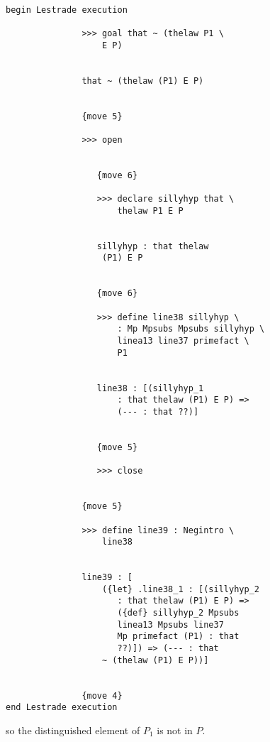 \documentclass[12pt]{article}
\begin{document}
\begin{verbatim}

begin Lestrade execution

               >>> goal that ~ (thelaw P1 \
                   E P)


               that ~ (thelaw (P1) E P)


               {move 5}

               >>> open


                  {move 6}

                  >>> declare sillyhyp that \
                      thelaw P1 E P


                  sillyhyp : that thelaw 
                   (P1) E P


                  {move 6}

                  >>> define line38 sillyhyp \
                      : Mp Mpsubs Mpsubs sillyhyp \
                      linea13 line37 primefact \
                      P1


                  line38 : [(sillyhyp_1 
                      : that thelaw (P1) E P) => 
                      (--- : that ??)]


                  {move 5}

                  >>> close


               {move 5}

               >>> define line39 : Negintro \
                   line38


               line39 : [
                   ({let} .line38_1 : [(sillyhyp_2 
                      : that thelaw (P1) E P) => 
                      ({def} sillyhyp_2 Mpsubs 
                      linea13 Mpsubs line37 
                      Mp primefact (P1) : that 
                      ??)]) => (--- : that 
                   ~ (thelaw (P1) E P))]


               {move 4}
end Lestrade execution
\end{verbatim}

so the distinguished element of $P_1$ is not in $P$.
\end{document}
